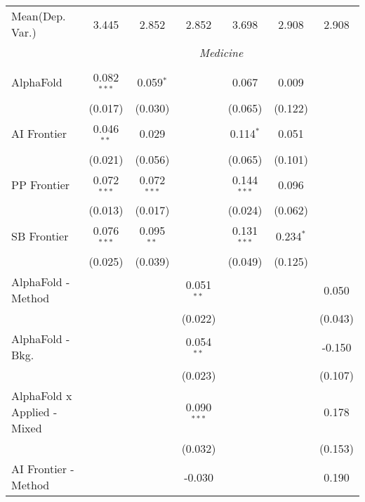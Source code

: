 \begin{tabular}{lcccccc}
Mean(Dep. Var.) & 3.445 & 2.852 & 2.852 & 3.698 & 2.908 & 2.908 \\
 & \multicolumn{6}{c}{\textit{Medicine}} \\ \\
   AlphaFold                     & 0.082$^{***}$ & 0.059$^{*}$   &               & 0.067         & 0.009       &   \\   
                                 & (0.017)       & (0.030)       &               & (0.065)       & (0.122)     &   \\   
   AI Frontier                   & 0.046$^{**}$  & 0.029         &               & 0.114$^{*}$   & 0.051       &   \\   
                                 & (0.021)       & (0.056)       &               & (0.065)       & (0.101)     &   \\   
   PP Frontier                   & 0.072$^{***}$ & 0.072$^{***}$ &               & 0.144$^{***}$ & 0.096       &   \\   
                                 & (0.013)       & (0.017)       &               & (0.024)       & (0.062)     &   \\   
   SB Frontier                   & 0.076$^{***}$ & 0.095$^{**}$  &               & 0.131$^{***}$ & 0.234$^{*}$ &   \\   
                                 & (0.025)       & (0.039)       &               & (0.049)       & (0.125)     &   \\   
   AlphaFold - Method            &               &               & 0.051$^{**}$  &               &             & 0.050\\   
                                 &               &               & (0.022)       &               &             & (0.043)\\   
   AlphaFold - Bkg.              &               &               & 0.054$^{**}$  &               &             & -0.150\\   
                                 &               &               & (0.023)       &               &             & (0.107)\\   
   AlphaFold x Applied - Mixed   &               &               & 0.090$^{***}$ &               &             & 0.178\\   
                                 &               &               & (0.032)       &               &             & (0.153)\\   
   AI Frontier - Method          &               &               & -0.030        &               &             & 0.190\\   

\end{tabular}
